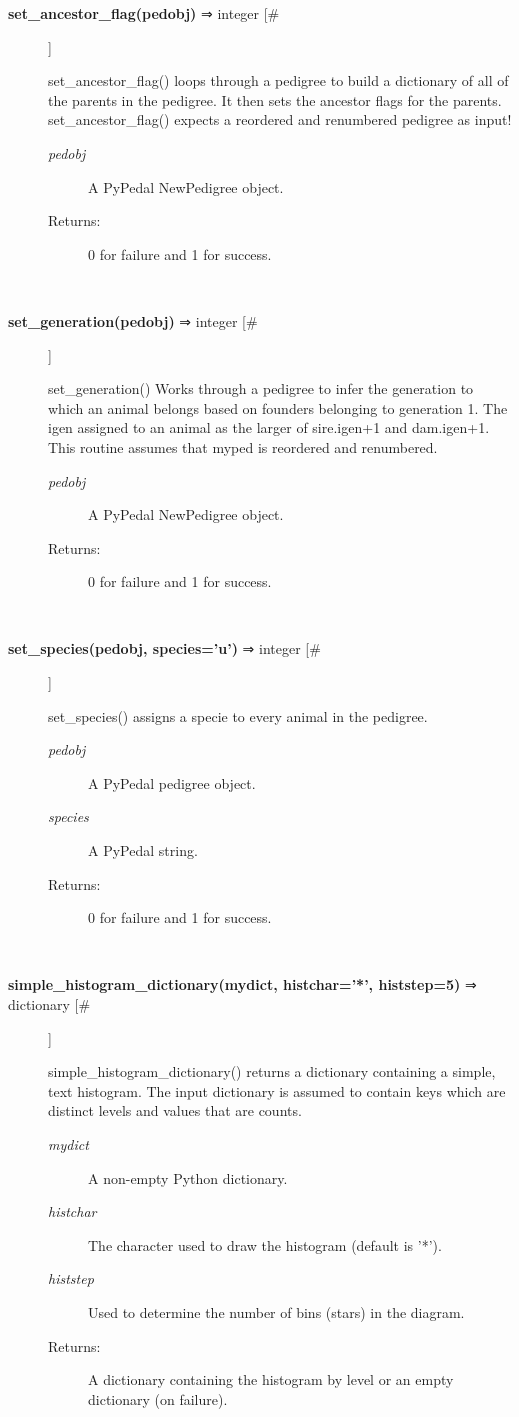 \documentclass{article}
\begin{document}
\begin{description}
\item[\textbf{set\_ancestor\_flag(pedobj)} ⇒ integer [\#]
]
\par set\_ancestor\_flag() loops through a pedigree to build a dictionary of all of the parents
in the pedigree.  It then sets the ancestor flags for the parents.  set\_ancestor\_flag()
expects a reordered and renumbered pedigree as input!
\begin{description}
\item[\textit{pedobj}
]
A PyPedal NewPedigree object.
\item[Returns:
]
0 for failure and 1 for success.
\end{description}\\

\item[\textbf{set\_generation(pedobj)} ⇒ integer [\#]
]
\par set\_generation() Works through a pedigree to infer the generation to which an animal
belongs based on founders belonging to generation 1.  The igen assigned to an animal
as the larger of sire.igen+1 and dam.igen+1.  This routine assumes that myped is
reordered and renumbered.
\begin{description}
\item[\textit{pedobj}
]
A PyPedal NewPedigree object.
\item[Returns:
]
0 for failure and 1 for success.
\end{description}\\

\item[\textbf{set\_species(pedobj, species='u')} ⇒ integer [\#]
]
\par set\_species() assigns a specie to every animal in the pedigree.
\begin{description}
\item[\textit{pedobj}
]
A PyPedal pedigree object.
\item[\textit{species}
]
A PyPedal string.
\item[Returns:
]
0 for failure and 1 for success.
\end{description}\\

\item[\textbf{simple\_histogram\_dictionary(mydict, histchar='*', histstep=5)} ⇒ dictionary [\#]
]
\par simple\_histogram\_dictionary() returns a dictionary containing a simple, text histogram.
The input dictionary is assumed to contain keys which are distinct levels and values
that are counts.
\begin{description}
\item[\textit{mydict}
]
A non-empty Python dictionary.
\item[\textit{histchar}
]
The character used to draw the histogram (default is '*').
\item[\textit{histstep}
]
Used to determine the number of bins (stars) in the diagram.
\item[Returns:
]
A dictionary containing the histogram by level or an empty dictionary (on failure).
\end{description}\\


\end{description}
\end{document}
